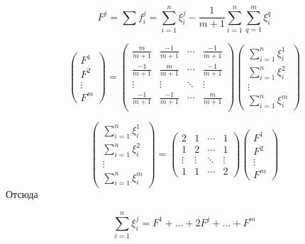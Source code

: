 \documentclass[12pt,a4paper,titlepage,oneside]{book}
\theoremstyle{definition}
\theoremstyle{plain}
\theoremstyle{remark}
\theoremstyle{remark}
\theoremstyle{plain}
\theoremstyle{plain}
\begin{document}
\begin{equation}
F^j = \sum\limits f_i^j = \sum\limits_{i=1}^n \xi_i^j - \frac{1}{m+1} \sum\limits_{i=1}^n \sum\limits_{q=1}^m \xi_i^q
\end{equation}

\begin{equation*}
\begin{pmatrix}
F^1 \\ F^2 \\ \vdots\\ F^m 
\end{pmatrix} 
=
\begin{pmatrix}
\frac{m}{m+1} & \frac{-1}{m+1} & \cdots & \frac{-1}{m+1} \\
\frac{-1}{m+1} & \frac{m}{m+1} & \cdots & \frac{-1}{m+1} \\
\vdots & \vdots & \ddots & \vdots\\
\frac{-1}{m+1} & \frac{-1}{m+1} & \cdots & \frac{m}{m+1} \\
\end{pmatrix}
\begin{pmatrix}
\sum\limits_{i=1}^n \xi_i^1 \\ \sum\limits_{i=1}^n \xi_i^2 \\ \vdots \\ \sum\limits_{i=1}^n \xi_i^m
\end{pmatrix}
\end{equation*}

\begin{equation*}
\begin{pmatrix}
\sum\limits_{i=1}^n \xi_i^1 \\ \sum\limits_{i=1}^n \xi_i^2 \\ \vdots \\ \sum\limits_{i=1}^n \xi_i^m
\end{pmatrix}
=
\begin{pmatrix}
2 & 1 & \cdots & 1\\
1 & 2 & \cdots & 1\\
\vdots & \vdots & \ddots & \vdots\\
1 & 1 & \cdots & 2 
\end{pmatrix}
\begin{pmatrix}
F^1 \\ F^2 \\ \vdots\\ F^m 
\end{pmatrix}
\end{equation*}
Отсюда

\begin{equation*}
\sum\limits_{i=1}^n\xi_i^j = F^1 + \dots + 2F^j+ \dots + F^m
\end{equation*}
\end{document}
